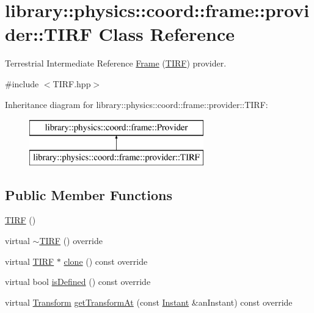 \hypertarget{classlibrary_1_1physics_1_1coord_1_1frame_1_1provider_1_1_t_i_r_f}{}\section{library\+:\+:physics\+:\+:coord\+:\+:frame\+:\+:provider\+:\+:T\+I\+RF Class Reference}
\label{classlibrary_1_1physics_1_1coord_1_1frame_1_1provider_1_1_t_i_r_f}


Terrestrial Intermediate Reference \hyperlink{classlibrary_1_1physics_1_1coord_1_1_frame}{Frame} (\hyperlink{classlibrary_1_1physics_1_1coord_1_1frame_1_1provider_1_1_t_i_r_f}{T\+I\+RF}) provider.  




{\ttfamily \#include $<$T\+I\+R\+F.\+hpp$>$}

Inheritance diagram for library\+:\+:physics\+:\+:coord\+:\+:frame\+:\+:provider\+:\+:T\+I\+RF\+:\begin{figure}[H]
\begin{center}
\leavevmode
\includegraphics[height=2.000000cm]{classlibrary_1_1physics_1_1coord_1_1frame_1_1provider_1_1_t_i_r_f}
\end{center}
\end{figure}
\subsection*{Public Member Functions}
\begin{DoxyCompactItemize}
\item 
\hyperlink{classlibrary_1_1physics_1_1coord_1_1frame_1_1provider_1_1_t_i_r_f_af1a083499a1623494ae95abd5adbfb93}{T\+I\+RF} ()
\item 
virtual \hyperlink{classlibrary_1_1physics_1_1coord_1_1frame_1_1provider_1_1_t_i_r_f_ade20a8def3caccb02466e2349e0924e5}{$\sim$\+T\+I\+RF} () override
\item 
virtual \hyperlink{classlibrary_1_1physics_1_1coord_1_1frame_1_1provider_1_1_t_i_r_f}{T\+I\+RF} $\ast$ \hyperlink{classlibrary_1_1physics_1_1coord_1_1frame_1_1provider_1_1_t_i_r_f_a48ef3f686e9bcc744a5e3d1fa1779ab6}{clone} () const override
\item 
virtual bool \hyperlink{classlibrary_1_1physics_1_1coord_1_1frame_1_1provider_1_1_t_i_r_f_a3656639fda8a7b991335752559d7594b}{is\+Defined} () const override
\item 
virtual \hyperlink{classlibrary_1_1physics_1_1coord_1_1_transform}{Transform} \hyperlink{classlibrary_1_1physics_1_1coord_1_1frame_1_1provider_1_1_t_i_r_f_a89eea1b9ff4b38937bf51099e8dd6333}{get\+Transform\+At} (const \hyperlink{classlibrary_1_1physics_1_1time_1_1_instant}{Instant} \&an\+Instant) const override
\end{DoxyCompactItemize}


